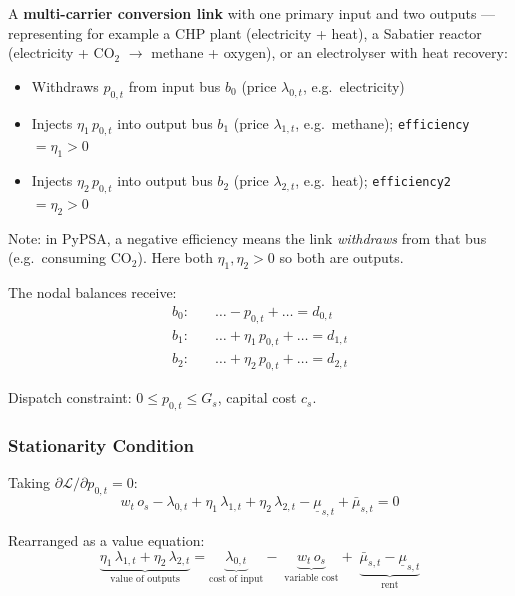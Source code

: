 \documentclass{article}
\begin{document}
A \textbf{multi-carrier conversion link} with one primary input and two outputs
--- representing for example a CHP plant (electricity + heat), a Sabatier reactor
(electricity + CO$_2$ $\to$ methane + oxygen), or an electrolyser with heat recovery:

\begin{itemize}
    \item Withdraws $p_{0,t}$ from input bus $b_0$ (price $\lambda_{0,t}$,
          e.g.\ electricity)
    \item Injects $\eta_1\, p_{0,t}$ into output bus $b_1$ (price $\lambda_{1,t}$,
          e.g.\ methane); \texttt{efficiency} $= \eta_1 > 0$
    \item Injects $\eta_2\, p_{0,t}$ into output bus $b_2$ (price $\lambda_{2,t}$,
          e.g.\ heat); \texttt{efficiency2} $= \eta_2 > 0$
\end{itemize}

Note: in PyPSA, a negative efficiency means the link \emph{withdraws} from that bus
(e.g.\ consuming CO$_2$). Here both $\eta_1, \eta_2 > 0$ so both are outputs.

The nodal balances receive:
\begin{align}
    b_0: & \quad \ldots - p_{0,t} + \ldots = d_{0,t} \\
    b_1: & \quad \ldots + \eta_1\, p_{0,t} + \ldots = d_{1,t} \\
    b_2: & \quad \ldots + \eta_2\, p_{0,t} + \ldots = d_{2,t}
\end{align}

Dispatch constraint: $0 \le p_{0,t} \le G_s$, capital cost $c_s$.

\subsubsection{Stationarity Condition}

Taking $\partial \mathcal{L}/\partial p_{0,t} = 0$:
\begin{equation}
    \boxed{
        w_t\, o_s
        - \lambda_{0,t}
        + \eta_1\, \lambda_{1,t}
        + \eta_2\, \lambda_{2,t}
        - \underline{\mu}_{s,t}
        + \bar{\mu}_{s,t} = 0
    }
    \label{eq:stat_multilink}
\end{equation}

Rearranged as a value equation:
\begin{equation}
    \underbrace{\eta_1\, \lambda_{1,t} + \eta_2\, \lambda_{2,t}}_{\text{value of outputs}}
    =
    \underbrace{\lambda_{0,t}}_{\text{cost of input}}
    -\;
    \underbrace{w_t\, o_s}_{\text{variable cost}}
    +\;
    \underbrace{\bar{\mu}_{s,t} - \underline{\mu}_{s,t}}_{\text{rent}}
    \label{eq:multilink_value}
\end{equation}
\end{document}
